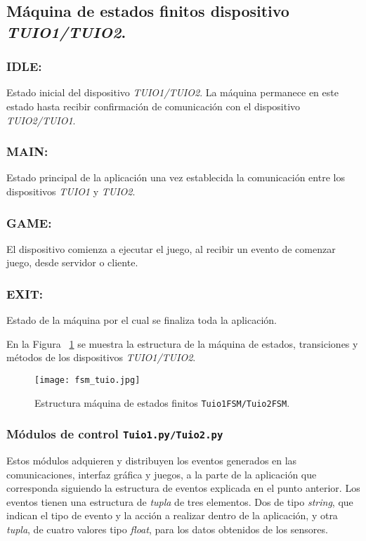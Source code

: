 \subsection{Máquina de estados finitos dispositivo \emph{TUIO1/TUIO2}.}

\subsubsection{IDLE:} Estado inicial del dispositivo \emph{TUIO1/TUIO2}. La máquina permanece en este estado hasta recibir confirmación de comunicación con el dispositivo \emph{TUIO2/TUIO1}.
\subsubsection{MAIN:} Estado principal de la aplicación una vez establecida la comunicación entre los dispositivos \emph{TUIO1} y \emph{TUIO2}.
\subsubsection{GAME:} El dispositivo comienza a ejecutar el juego, al recibir un evento de comenzar juego, desde servidor o cliente.
\subsubsection{EXIT:} Estado de la máquina por el cual se finaliza toda la aplicación.

En la Figura ~\ref{fig:fsmtuio} se muestra la estructura de la máquina de estados, transiciones y métodos de los dispositivos \emph{TUIO1/TUIO2}.

\begin{figure}[!h]
\begin{center}
\texttt{[image: fsm\_tuio.jpg]}
\caption{Estructura máquina de estados finitos \texttt{Tuio1FSM/Tuio2FSM}.}
\label{fig:fsmtuio}
\end{center}
\end{figure}


\subsubsection{Módulos de control \texttt{Tuio1.py/Tuio2.py}}

Estos módulos adquieren y distribuyen los eventos generados en las comunicaciones, interfaz gráfica y juegos, a la parte de la aplicación que corresponda siguiendo la estructura de eventos explicada en el punto anterior.
Los eventos tienen una estructura de \emph{tupla} de tres elementos. Dos de tipo \emph{string}, que indican el tipo de evento y la acción a realizar dentro de la aplicación, y otra \emph{tupla}, de cuatro valores tipo \emph{float}, para los datos obtenidos de los sensores.

